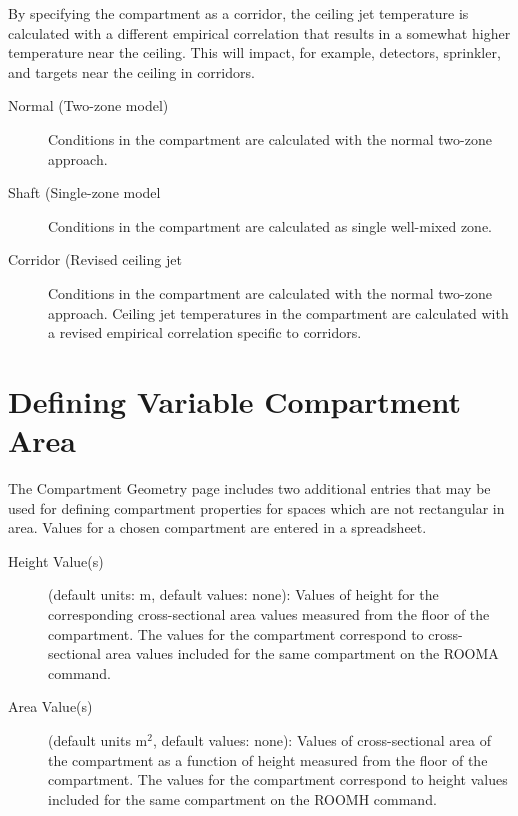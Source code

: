By specifying the compartment as a corridor, the ceiling jet temperature is calculated with a different empirical correlation that results in a somewhat higher temperature near the ceiling.  This will impact, for example, detectors, sprinkler, and targets near the ceiling in corridors.

\begin{description}
\item[Normal (Two-zone model)] Conditions in the compartment are calculated with the normal two-zone approach.

\item[Shaft (Single-zone model] Conditions in the compartment are calculated as single well-mixed zone.

\item[Corridor (Revised ceiling jet] Conditions in the compartment are calculated with the normal two-zone approach. Ceiling jet temperatures in the compartment are calculated with a revised empirical correlation specific to corridors.
\end{description}


\section{Defining Variable Compartment Area}

The Compartment Geometry page includes two additional entries that may be used for defining compartment properties for spaces which are not rectangular in area.  Values for a chosen compartment are entered in a spreadsheet.

\begin{description}
\item[Height Value(s)] (default units: m, default values: none): Values of height for the corresponding cross-sectional area values measured from the floor of the compartment. The values for the compartment correspond to cross-sectional area values included for the same compartment on the ROOMA command.

\item[Area Value(s)] (default units m$^2$, default values: none): Values of cross-sectional area of the compartment as a function of height measured from the floor of the compartment. The values for the compartment correspond to height values included for the same compartment on the ROOMH command.
\end{description}


